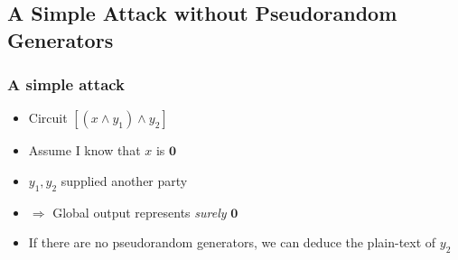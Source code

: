 \documentclass{beamer}
\begin{document}
\subsection{A Simple Attack without Pseudorandom Generators}

\begin{frame}
  \frametitle{A simple attack}
  \begin{itemize}
  \item Circuit $[(x \wedge y_1) \wedge y_2]$
  \item Assume I know that $x$ is $\mathbf{0}$
  \item $y_1, y_2$ supplied another party
  \item $\Rightarrow$ Global output represents \emph{surely} $\mathbf{0}$
  \item If there are no pseudorandom generators, we can deduce the plain-text of $y_2$
  \end{itemize}
  \begin{center}
  \end{center}
\end{frame}
\end{document}
